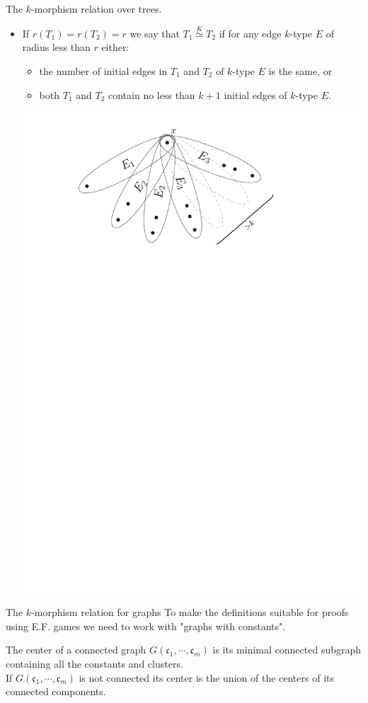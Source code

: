 \documentclass[11pt]{beamer}
\newcommand{\clist}{\mathfrak{c}_{1}, \cdots, \mathfrak{c}_m}
\newcommand{\morph}[1]{\stackrel{#1}{\simeq}}
\begin{document}
	\begin{frame}{The $k$-morphism relation over trees.}
		\begin{itemize}
		\item If $r(T_1)=r(T_2)=r$ we say that $T_1\morph{K}T_2$ if
		for any edge $k$-type $E$ of radius less than $r$ either:
		\begin{itemize}
			\vspace{0.2 em}
			\item the number of initial edges in $T_1$ and $T_2$ of $k$-type $E$ 
			is the same, or
			\vspace{0.2 em}
			\item both $T_1$ and $T_2$ contain no less than $k+1$
			initial edges of $k$-type $E$. 
		\end{itemize}
		\begin{center}
			\includegraphics[width=0.7\linewidth]{Try.pdf}
		\end{center}
			
		\end{itemize}
	
		
	\end{frame}

	\begin{frame}{The $k$-morphism relation for graphs}
		To make the definitions suitable for proofs using E.F. games we need to work with "graphs
		with constants". 
		\begin{definition}
			The center of a connected graph $G(\clist)$ is its minimal 
			connected subgraph containing all the constants and clusters.\\
			\vspace{0.2 em} If $G(\clist)$
			is not connected its center is the union of the centers of its connected
			components.   
		\end{definition}
	\end{frame}
\end{document}
